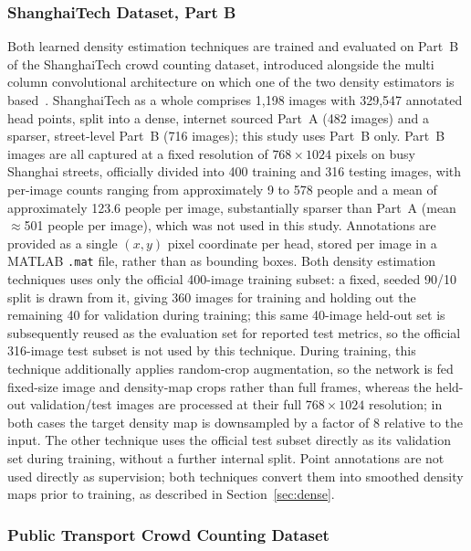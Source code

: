 \documentclass[12pt,a4paper]{report}
\begin{document}
\subsubsection{ShanghaiTech Dataset, Part B}
Both learned density estimation techniques are trained and evaluated on Part~B of the ShanghaiTech crowd counting dataset, introduced alongside the multi column convolutional architecture on which one of the two density estimators is based~\cite{Zhu2020}. ShanghaiTech as a whole comprises 1{,}198 images with 329{,}547 annotated head points, split into a dense, internet sourced Part~A (482 images) and a sparser, street-level Part~B (716 images); this study uses Part~B only. Part~B images are all captured at a fixed resolution of $768{\times}1024$ pixels on busy Shanghai streets, officially divided into 400 training and 316 testing images, with per-image counts ranging from approximately 9 to 578 people and a mean of approximately 123.6 people per image, substantially sparser than Part~A (mean $\approx$501 people per image), which was not used in this study. Annotations are provided as a single $(x,y)$ pixel coordinate per head, stored per image in a MATLAB \texttt{.mat} file, rather than as bounding boxes. Both density estimation techniques uses only the official 400-image training subset: a fixed, seeded 90/10 split is drawn from it, giving 360 images for training and holding out the remaining 40 for validation during training; this same 40-image held-out set is subsequently reused as the evaluation set for reported test metrics, so the official 316-image test subset is not used by this technique. During training, this technique additionally applies random-crop augmentation, so the network is fed fixed-size image and density-map crops rather than full frames, whereas the held-out validation/test images are processed at their full $768{\times}1024$ resolution; in both cases the target density map is downsampled by a factor of 8 relative to the input. The other technique uses the official test subset directly as its validation set during training, without a further internal split. Point annotations are not used directly as supervision; both techniques convert them into smoothed density maps prior to training, as described in Section~\ref{sec:dense}.


\subsubsection{Public Transport Crowd Counting Dataset}
\label{sec:ptccd}
\end{document}
